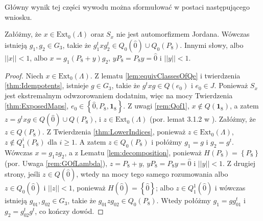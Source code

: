 {Główny wynik tej części wywodu można sformułować w postaci następującego wniosku.
\begin{Corollary}
\label{cor:q0}
    Załóżmy, że $x \in \text{Ext}_{0}(\Lambda)$ oraz $S_{x}$ nie jest
    automorfizmem Jordana.
    Wówczas istnieją $g_{1}, g_{2} \in G_{3}$,
    takie że $g_{1}^{t} x g_{2}^{t} \in Q_{0}(\hat{0}) \cup Q_{0}(P_{8})$.
    Innymi słowy, albo $||x|| < 1$,
    albo
    $x = g_{1} (P_{8} + y) g_{2}$,  $y P_{8} = P_{8} y = \hat{0}$
    i $|| y || < 1$.
\end{Corollary}
\begin{proof}
Niech $x \in  \text{Ext}_{0}(\Lambda)$.
    Z lematu \ref{lem:equivClassesOfQe} i twierdzenia \ref{thm:Idempotents},
    istnieje $g \in G_{3}$, takie że
    $g^{t} x g \in Q(e_{0})$ i $e_{0} \in J$.
    Ponieważ $S_{x}$ jest ekstremalnym odwzorowaniem dodatnim, więc na mocy
    Twierdzenia \ref{thm:ExposedMaps},
    $e_{0} \in \left \{ \hat{0}, P_{8}, \mathbf{1}_{8} \right \}$.
    Z uwagi \ref{rem:Qof1}, $x \notin Q(\mathbf{1}_{8})$, a zatem
    $z = g^{t} x g \in Q(\hat{0}) \cup Q(P_{8})$,
    i $z \in \text{Ext}_{0}(\Lambda)$
    (por. lemat 3.1.2 w \cite{Stormer2013}).
    Załóżmy, że $z \in Q(P_{8})$.
    Z Twierdzenia \ref{thm:LowerIndices},
    ponieważ $z \in \text{Ext}_{0}(\Lambda)$,
    $z \notin Q_{1}^{i}(P_{8})$
    dla $i \geq 1$.
    A zatem $z \in Q_{0}(P_{8})$ i połóżmy $g_{1} = g$ i $g_{2} = g^{t}$.
    Wówczas $x = g_{1} z g_{2}$,
    a z Lematu \ref{lem:decomposition}, ponieważ
    $H(P_{8}) = \left \{ P_{8} \right \}$
    (por. Uwaga \ref{rem:GOfLambda}),
    $z = P_{8} + y$,  $y P_{8} = P_{8} y = \hat{0}$ i $||y|| < 1$.
    Z drugiej strony, jeśli $z \in Q(\hat{0})$,
    wtedy na mocy tego samego rozumowania albo $z \in Q_{0}(\hat{0})$
    i $||z|| < 1$, ponieważ $H(\hat{0}) = \left \{ \hat{0} \right \}$; albo
    $z \in Q_{1}^{1}(\hat{0})$ i wówczas istnieją $g_{01}, g_{02} \in G_{3}$,
    takie że $g_{01} z g_{02} \in Q_{0}(P_{8})$.
    Wtedy połóżmy $g_{1} = g g_{01}^{t}$ i $g_{2} = g_{02}^{t} g^{t}$,
    co kończy dowód.
\end{proof}

}
